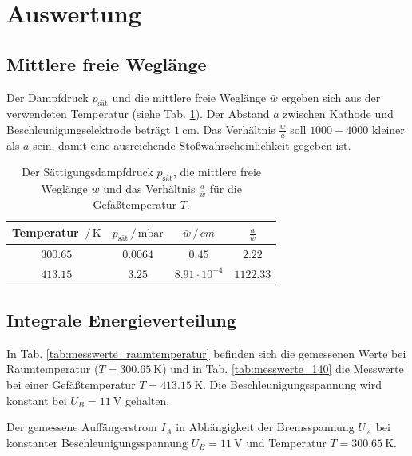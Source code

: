 \section{Auswertung}
\subsection{Mittlere freie Weglänge}
Der Dampfdruck $p_\text{sät}$ und die mittlere freie Weglänge $\bar{w}$ ergeben sich aus der verwendeten Temperatur (siehe Tab. \ref{tab:weglaenge}). %
Der Abstand $a$ zwischen Kathode und Beschleunigungselektrode beträgt $\SI{1}{\centi\metre}$.
Das Verhältnis $\frac{\bar{w}}{a}$ soll $1000 - 4000$ kleiner als $a$ sein, damit eine ausreichende Stoßwahrscheinlichkeit gegeben ist.
\begin{table}
    \centering
    \begin{tabular}{cccc}
        \toprule
        Temperatur $\,/\, \si{\kelvin}$ & $p_\text{sät} \,/\, \si{\milli\bar}$ & $\bar{w} \,/\, \si{cm}$ & $\frac{a}{\bar{w}}$ \\
        \midrule
        $300.65$ & $0.0064$ & $0.45$ & $2.22$ \\
        $413.15$ & $3.25$ & $8.91 \cdot 10^{-4}$ & $1122.33$ \\
        \bottomrule
    \end{tabular}
    \caption{Der Sättigungsdampfdruck $p_\text{sät}$, die mittlere freie Weglänge $\bar{w}$ und das Verhältnis $\frac{a}{\bar{w}}$ für die Gefäßtemperatur $T$.}
    \label{tab:weglaenge}
\end{table}

\FloatBarrier
\subsection{Integrale Energieverteilung}
In Tab. \ref{tab:messwerte_raumtemperatur} befinden sich die gemessenen Werte bei Raumtemperatur ($T=\SI{300.65}{\kelvin}$) und in Tab. \ref{tab:messwerte_140} die Messwerte bei einer Gefäßtemperatur $T=\SI{413.15}{\kelvin}$.
Die Beschleunigungsspannung wird konstant bei $U_B = \SI{11}{\volt}$ gehalten.
\begin{table}
    \centering
    \caption{Der gemessene Auffängerstrom $I_A$ in Abhängigkeit der Bremsspannung $U_A$ bei konstanter Beschleunigungsspannung $U_B = \SI{11}{\volt}$ und Temperatur $T = \SI{300.65}{\kelvin}$.}
    \label{tab:messwerte_raumtemperatur}  
\end{table}

